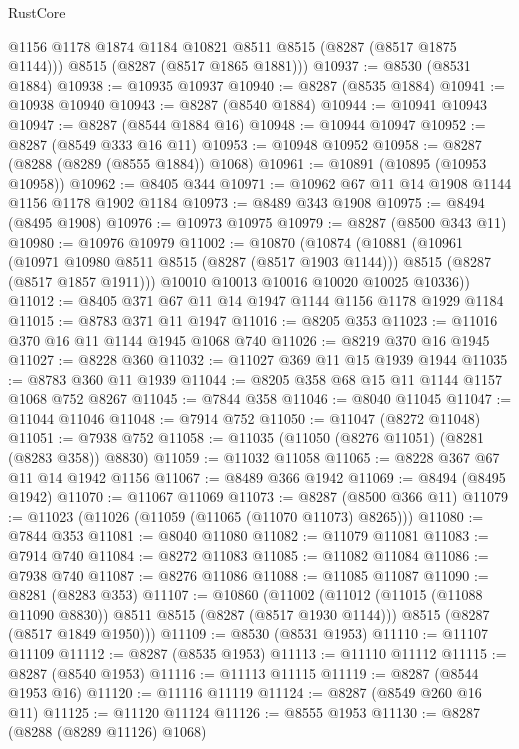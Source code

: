 \begin{lexlean}{RustCore}
\begin{coremodule}
        @1156
        @1178
        @1874
        @1184
        @10821
        @8511
        @8515
        (@8287 (@8517 @1875 @1144)))
      @8515
      (@8287 (@8517 @1865 @1881)))
@10937 := @8530 (@8531 @1884)
@10938 := @10935 @10937
@10940 := @8287 (@8535 @1884)
@10941 := @10938 @10940
@10943 := @8287 (@8540 @1884)
@10944 := @10941 @10943
@10947 := @8287 (@8544 @1884 @16)
@10948 := @10944 @10947
@10952 := @8287 (@8549 @333 @16 @11)
@10953 := @10948 @10952
@10958 := @8287 (@8288 (@8289 (@8555 @1884)) @1068)
@10961 := @10891 (@10895 (@10953 @10958))
@10962 := @8405 @344
@10971 := @10962 @67 @11 @14 @1908 @1144 @1156 @1178 @1902 @1184
@10973 := @8489 @343 @1908
@10975 := @8494 (@8495 @1908)
@10976 := @10973 @10975
@10979 := @8287 (@8500 @343 @11)
@10980 := @10976 @10979
@11002 := @10870
    (@10874
      (@10881
        (@10961
          (@10971 @10980 @8511 @8515 (@8287 (@8517 @1903 @1144)))
          @8515
          (@8287 (@8517 @1857 @1911)))
        @10010
        @10013
        @10016
        @10020
        @10025
        @10336))
@11012 := @8405 @371 @67 @11 @14 @1947 @1144 @1156 @1178 @1929 @1184
@11015 := @8783 @371 @11 @1947
@11016 := @8205 @353
@11023 := @11016 @370 @16 @11 @1144 @1945 @1068 @740
@11026 := @8219 @370 @16 @1945
@11027 := @8228 @360
@11032 := @11027 @369 @11 @15 @1939 @1944
@11035 := @8783 @360 @11 @1939
@11044 := @8205 @358 @68 @15 @11 @1144 @1157 @1068 @752 @8267
@11045 := @7844 @358
@11046 := @8040 @11045
@11047 := @11044 @11046
@11048 := @7914 @752
@11050 := @11047 (@8272 @11048)
@11051 := @7938 @752
@11058 := @11035 (@11050 (@8276 @11051) (@8281 (@8283 @358)) @8830)
@11059 := @11032 @11058
@11065 := @8228 @367 @67 @11 @14 @1942 @1156
@11067 := @8489 @366 @1942
@11069 := @8494 (@8495 @1942)
@11070 := @11067 @11069
@11073 := @8287 (@8500 @366 @11)
@11079 := @11023 (@11026 (@11059 (@11065 (@11070 @11073) @8265)))
@11080 := @7844 @353
@11081 := @8040 @11080
@11082 := @11079 @11081
@11083 := @7914 @740
@11084 := @8272 @11083
@11085 := @11082 @11084
@11086 := @7938 @740
@11087 := @8276 @11086
@11088 := @11085 @11087
@11090 := @8281 (@8283 @353)
@11107 := @10860
    (@11002
      (@11012 (@11015 (@11088 @11090 @8830)) @8511 @8515 (@8287 (@8517 @1930 @1144)))
      @8515
      (@8287 (@8517 @1849 @1950)))
@11109 := @8530 (@8531 @1953)
@11110 := @11107 @11109
@11112 := @8287 (@8535 @1953)
@11113 := @11110 @11112
@11115 := @8287 (@8540 @1953)
@11116 := @11113 @11115
@11119 := @8287 (@8544 @1953 @16)
@11120 := @11116 @11119
@11124 := @8287 (@8549 @260 @16 @11)
@11125 := @11120 @11124
@11126 := @8555 @1953
@11130 := @8287 (@8288 (@8289 @11126) @1068)

\end{coremodule}
\end{lexlean}
